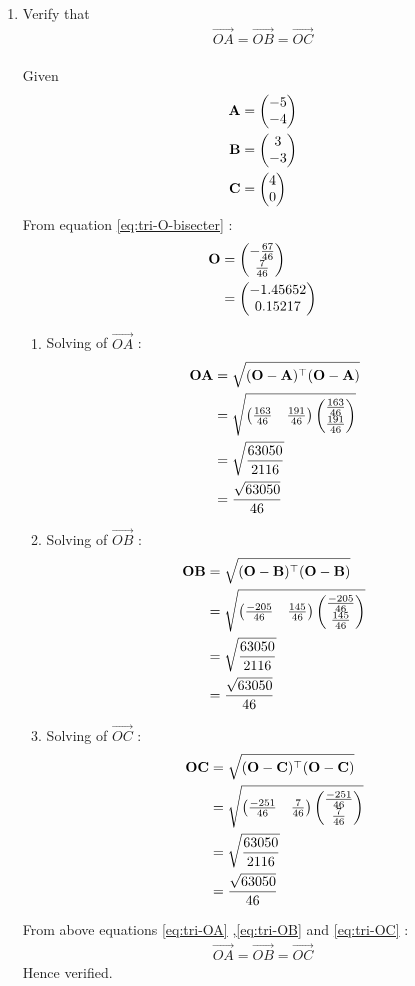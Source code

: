 \documentclass[10pt]{book}
\begin{document}
\begin{enumerate}[label=\thesection.\arabic*.,ref=\thesection.\theenumi]
\item Verify that 
\begin{align}
\vec{OA} = \vec{OB} = \vec{OC} 
\end{align} 
\solution \\
Given \begin{align}
\mathbf{A} &= \begin{pmatrix}-5\\-4\end{pmatrix}\\
\mathbf{B} &= \begin{pmatrix}3\\-3\end{pmatrix}\\
\mathbf{C} &= \begin{pmatrix}4\\0\end{pmatrix}
\end{align}
From equation \eqref{eq:tri-O-bisecter} :
\begin{align}
\mathbf{O} &= \begin{pmatrix}-\frac{67}{46} \\ \frac{7}{46}\end{pmatrix}\\
 &= \begin{pmatrix}-1.45652\\0.15217\end{pmatrix}
\end{align}
\begin{enumerate}
\item Solving of $\vec{OA}$ :
\begin{align}
\vec{OA}&= \sqrt{(\vec{O}-\vec{A})^{\top}(\vec{O}-\vec{A})}\\
&= \sqrt{\myvec{\frac{163}{46} & \frac{191}{46}} \myvec{\frac{163}{46}\\ \frac{191}{46}}}\\
 &= \sqrt{\frac{63050}{2116}}\\
 &= \frac{\sqrt{63050}}{46}
 \label{eq:tri-OA}
\end{align}
\item Solving of $\vec{OB}$ :
\begin{align}
\vec{OB}&= \sqrt{(\vec{O}-\vec{B})^{\top}(\vec{O}-\vec{B})}\\
 &= \sqrt{\myvec{\frac{-205}{46} & \frac{145}{46}} \myvec{\frac{-205}{46}\\ \frac{145}{46}}}\\
 &= \sqrt{\frac{63050}{2116}}\\
 &= \frac{\sqrt{63050}}{46}
  \label{eq:tri-OB}
\end{align}
\item Solving of $\vec{OC}$ :
\begin{align}
\vec{OC} &= \sqrt{(\vec{O}-\vec{C})^{\top}(\vec{O}-\vec{C})}\\
 &= \sqrt{\myvec{\frac{-251}{46} & \frac{7}{46}}  \myvec{\frac{-251}{46}\\ \frac{7}{46}}}\\
 &= \sqrt{\frac{63050}{2116}}\\
 &= \frac{\sqrt{63050}}{46}
  \label{eq:tri-OC}
\end{align}
\end{enumerate}
From above equations   \eqref{eq:tri-OA} ,\eqref{eq:tri-OB} and \eqref{eq:tri-OC} :
\begin{align}
\vec{OA} = \vec{OB} = \vec{OC}
\end{align}
Hence verified.


\end{enumerate}
\end{document}
